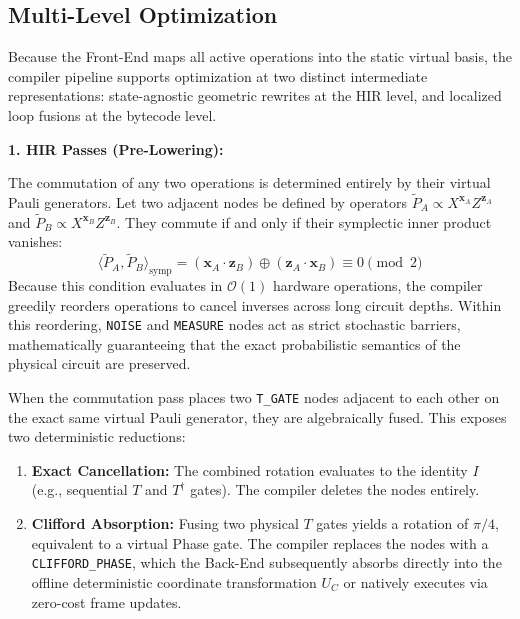 \documentclass[11pt]{article}
\begin{document}
\subsection{Multi-Level Optimization}
\label{sec:optimization}

Because the Front-End maps all active operations into the static virtual basis, the compiler pipeline supports optimization at two distinct intermediate representations: state-agnostic geometric rewrites at the HIR level, and localized loop fusions at the bytecode level.

\textbf{1. HIR Passes (Pre-Lowering):}

The commutation of any two operations is determined entirely by their virtual Pauli generators. Let two adjacent nodes be defined by operators $\tilde{P}_A \propto X^{\mathbf{x}_A} Z^{\mathbf{z}_A}$ and $\tilde{P}_B \propto X^{\mathbf{x}_B} Z^{\mathbf{z}_B}$. They commute if and only if their symplectic inner product vanishes:
\begin{equation}
    \langle \tilde{P}_A, \tilde{P}_B \rangle_{\text{symp}} = (\mathbf{x}_A \cdot \mathbf{z}_B) \oplus (\mathbf{z}_A \cdot \mathbf{x}_B) \equiv 0 \pmod 2
\end{equation}
Because this condition evaluates in $\mathcal{O}(1)$ hardware operations, the compiler greedily reorders operations to cancel inverses across long circuit depths. Within this reordering, \texttt{NOISE} and \texttt{MEASURE} nodes act as strict stochastic barriers, mathematically guaranteeing that the exact probabilistic semantics of the physical circuit are preserved.

When the commutation pass places two \texttt{T\_GATE} nodes adjacent to each other on the exact same virtual Pauli generator, they are algebraically fused. This exposes two deterministic reductions:
\begin{enumerate}
    \item \textbf{Exact Cancellation:} The combined rotation evaluates to the identity $I$ (e.g., sequential $T$ and $T^\dagger$ gates). The compiler deletes the nodes entirely.
    \item \textbf{Clifford Absorption:} Fusing two physical $T$ gates yields a rotation of $\pi/4$, equivalent to a virtual Phase gate. The compiler replaces the nodes with a \texttt{CLIFFORD\_PHASE}, which the Back-End subsequently absorbs directly into the offline deterministic coordinate transformation $U_C$ or natively executes via zero-cost frame updates.
\end{enumerate}
\end{document}
